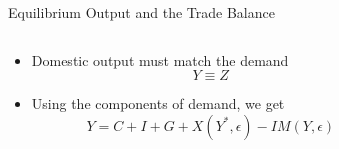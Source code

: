 \documentclass[shownotes,11pt, aspectratio=169]{beamer}
\begin{document}
\begin{frame}{Equilibrium Output and the Trade Balance}
\begin{columns}[T] %
\begin{column}{.36\textwidth}
\begin{itemize}
\item Domestic output must match the demand
     \[ Y \equiv Z \]
\item Using the components of demand, we get 
     \[ Y = C + I + G + X(Y^{\ast},\epsilon) - IM(Y, \epsilon) \]
\end{itemize}
\end{column}
\hfill
\pause
\begin{column}{.54\textwidth}
\end{column}
\end{columns}
\end{frame}
\end{document}
